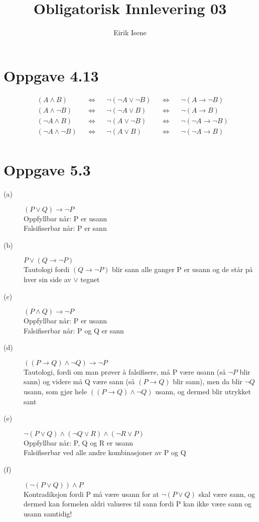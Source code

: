\documentclass[norsk, 12pt]{article}
\title{Obligatorisk Innlevering 03}
\author{Eirik Isene}
\begin{document}
\maketitle

\section{Oppgave 4.13}
\begin{align*}
&(A \land B)& &\Leftrightarrow& &\neg(\neg A \lor \neg B)& &\Leftrightarrow& &\neg(A \to \neg B) \\
&(A \land \neg B)& &\Leftrightarrow& &\neg(\neg A \lor B)& &\Leftrightarrow& &\neg(A \to B) \\
&(\neg A \land B)& &\Leftrightarrow& &\neg(A \lor \neg B)& &\Leftrightarrow& &\neg(\neg A \to \neg B) \\
&(\neg A \land \neg B)& &\Leftrightarrow& &\neg(A \lor B)& &\Leftrightarrow& &\neg(\neg A \to B) \\
\end{align*}

\section{Oppgave 5.3}
\begin{description}
\item[(a)] $(P \lor Q) \to \neg P$ \\ Oppfyllbar når: P er usann \\ Falsifiserbar når: P er sann
\item[(b)] $P \lor (Q \to \neg P)$ \\ Tautologi fordi $(Q \to \neg P)$ blir sann alle ganger P er usann og de står på hver sin side av $\lor$ tegnet
\item[(c)] $(P \land Q) \to \neg P$ \\ Oppfyllbar når: P er usann \\ Falsifiserbar når: P og Q er sann
\item[(d)] $((P \to Q) \land \neg Q) \to \neg P$ \\ Tautologi, fordi om man prøver å falsifisere, må P være usann (så $\neg P$ blir sann) og videre må Q være sann (så $(P \to Q)$ blir sann), men da blir $\neg Q$ usann, som gjør hele $((P \to Q) \land \neg Q)$ usann, og dermed blir utrykket sant
\item[(e)] $\neg(P \lor Q)\land (\neg Q \lor R) \land (\neg R \lor P)$ \\ Oppfyllbar når: P, Q og R er usann \\ Falsifiserbar ved alle andre kombinasjoner av P og Q
\item[(f)] $(\neg(P \lor Q)) \land P$ \\ Kontradiksjon fordi P må være usann for at $\neg(P \lor Q)$ skal være sann, og dermed kan formelen aldri valueres til sann fordi P kan ikke være sann og usann samtidig!
\end{description}
\end{document}

